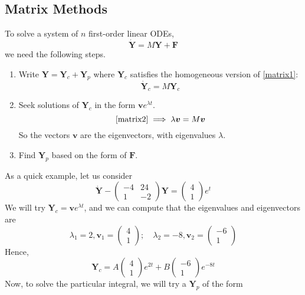 \documentclass{article}
\begin{document}
	\subsection{Matrix Methods}
	To solve a system of $n$ first-order linear ODEs,
	\begin{equation}\label{matrix1}
		\dot {\bm Y} = M\bm Y + \bm F
	\end{equation}
	we need the following steps.
	\begin{enumerate}
		\item Write $\bm Y = \bm Y_c + \bm Y_p$ where $\bm Y_c$ satisfies the homogeneous version of \eqref{matrix1}:
		\begin{equation}\label{matrix2}
			\dot {\bm Y}_c = M\bm Y_c
		\end{equation}
		\item Seek solutions of $\bm Y_c$ in the form $\bm v e^{\lambda t}$.
		\[ \eqref{matrix2} \implies \lambda \bm v = M\bm v \]
		So the vectors $\bm v$ are the eigenvectors, with eigenvalues $\lambda$.
		\item Find $\bm Y_p$ based on the form of $\bm F$.
	\end{enumerate}
	As a quick example, let us consider
	\begin{equation}\label{matrixexample}
		\dot {\bm Y} - \begin{pmatrix}
			-4 & 24 \\ 1 & -2
		\end{pmatrix}\bm Y = \begin{pmatrix}
			4 \\ 1
		\end{pmatrix}e^t
	\end{equation}
	We will try $\bm Y_c = \bm v e^{\lambda t}$, and we can compute that the eigenvalues and eigenvectors are
	\[ \lambda_1 = 2, \bm v_1 = \begin{pmatrix}
		4 \\ 1
	\end{pmatrix};\quad \lambda_2 = -8, \bm v_2 = \begin{pmatrix}
		-6 \\ 1
	\end{pmatrix} \]
	Hence,
	\[ \bm Y_c = A\begin{pmatrix}
		4 \\ 1
	\end{pmatrix}e^{2t} + B\begin{pmatrix}
		-6 \\ 1
	\end{pmatrix}e^{-8t} \]
	Now, to solve the particular integral, we will try a $\bm Y_p$ of the form
\end{document}
